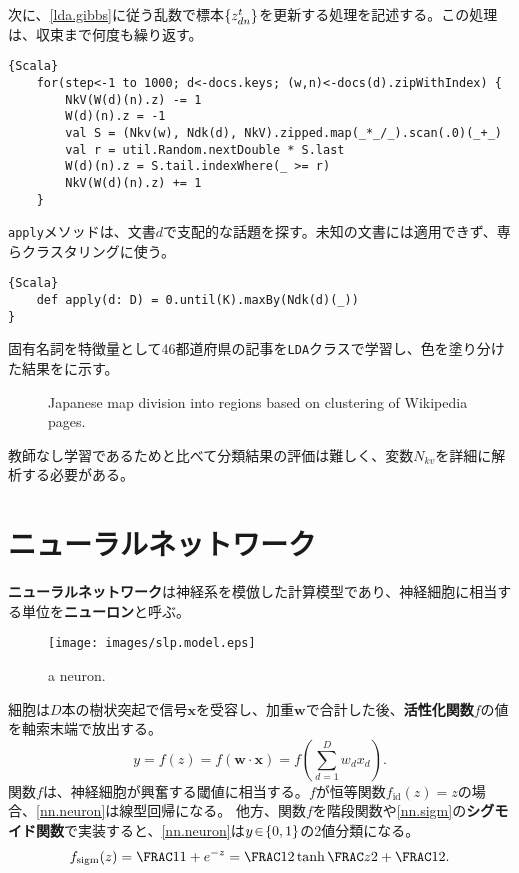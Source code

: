 \documentclass[10pt,a4paper]{book}
\begin{document}
次に、\eqref{lda.gibbs}に従う乱数で標本$\seq{z_{dn}^t}$を更新する処理を記述する。この処理は、収束まで何度も繰り返す。

\begin{Verbatim}{Scala}
	for(step<-1 to 1000; d<-docs.keys; (w,n)<-docs(d).zipWithIndex) {
		NkV(W(d)(n).z) -= 1
		W(d)(n).z = -1
		val S = (Nkv(w), Ndk(d), NkV).zipped.map(_*_/_).scan(.0)(_+_)
		val r = util.Random.nextDouble * S.last
		W(d)(n).z = S.tail.indexWhere(_ >= r)
		NkV(W(d)(n).z) += 1
	}
\end{Verbatim}

\texttt{apply}メソッドは、文書$d$で支配的な話題を探す。未知の文書には適用できず、専らクラスタリングに使う。

\begin{Verbatim}{Scala}
	def apply(d: D) = 0.until(K).maxBy(Ndk(d)(_))
}
\end{Verbatim}

固有名詞を特徴量として46都道府県の記事を\texttt{LDA}クラスで学習し、色を塗り分けた結果をに示す。

\begin{figure}[h]
\centering
{}
\caption{Japanese map division into regions based on clustering of Wikipedia pages.\label{fig:lda.jmap}}
\end{figure}

教師なし学習であるためと比べて分類結果の評価は難しく、変数$N_{kv}$を詳細に解析する必要がある。

\chapter{ニューラルネットワーク\label{chap:nn}}

\textbf{ニューラルネットワーク}は神経系を模倣した計算模型であり、神経細胞に相当する単位を\textbf{ニューロン}と呼ぶ。

\begin{figure}[h]
\centering
\texttt{[image: images/slp.model.eps]}
\caption{a neuron.\label{fig:slp.model}}
\end{figure}

細胞は$D$本の樹状突起で信号$\bm{x}$を受容し、加重$\bm{w}$で合計した後、\textbf{活性化関数}$f$の値を軸索末端で放出する。
%
\begin{equation}
\label{eq:nn.neuron}
y = f(z) = f(\bm{w} \cdot \bm{x}) = f\left(\sum_{d=1}^D w_d x_d\right).
\end{equation}
%
関数$f$は、神経細胞が興奮する閾値に相当する。$f$が恒等関数$f_\mathrm{id}(z)\!=\!z$の場合、\eqref{nn.neuron}は線型回帰になる。
他方、関数$f$を階段関数や\eqref{nn.sigm}の\textbf{シグモイド関数}で実装すると、\eqref{nn.neuron}は$y\!\in\!\seq{0,1}$の2値分類になる。
%
\begin{equation}
\label{eq:nn.sigm}
\sigm(z) = \frac{1}{1 + e^{-z}} = \frac{1}{2}\tanh\frac{z}{2} + \frac{1}{2}.
\end{equation}
\end{document}
